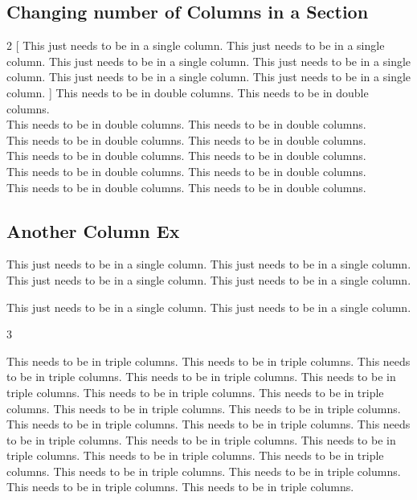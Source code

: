 \documentclass[12pt,twoside,a4paper]{article}
\begin{document}
\subsection*{Changing number of Columns in a Section}
\begin{multicols}{2}
  [
This just needs to be in a single column. This just needs to be in a single column. This just needs to be in a single column. This just needs to be in a single column. This just needs to be in a single column. This just needs to be in a single column.
]
\noindent This needs to be in double columns. This needs to be in double columns.
\\This needs to be in double columns. This needs to be in double columns.
\\This needs to be in double columns. This needs to be in double columns.
\\This needs to be in double columns. This needs to be in double columns.
\\This needs to be in double columns. This needs to be in double columns.
\\This needs to be in double columns. This needs to be in double columns.

\end{multicols}

\subsection*{Another Column Ex}
\par This just needs to be in a single column. This just needs to be in a single column. This just needs to be in a single column. This just needs to be in a single column. \par This just needs to be in a single column. This just needs to be in a single column.

\begin{multicols}{3}
  \setlength{\columnsep}{0.5cm}
  \setlength{\columnseprule}{0pt} %

  This needs to be in triple columns. This needs to be in triple columns. This needs to be in triple columns. This needs to be in triple columns. This needs to be in triple columns. This needs to be in triple columns.
  \newline This needs to be in triple columns. This needs to be in triple columns.
  \newline This needs to be in triple columns. This needs to be in triple columns.
  \newline This needs to be in triple columns. This needs to be in triple columns.
  \newline This needs to be in triple columns. This needs to be in triple columns.
  \newline This needs to be in triple columns. This needs to be in triple columns.
  \newline This needs to be in triple columns. This needs to be in triple columns.
  \newline This needs to be in triple columns. This needs to be in triple columns.
\end{multicols}
\end{document}
